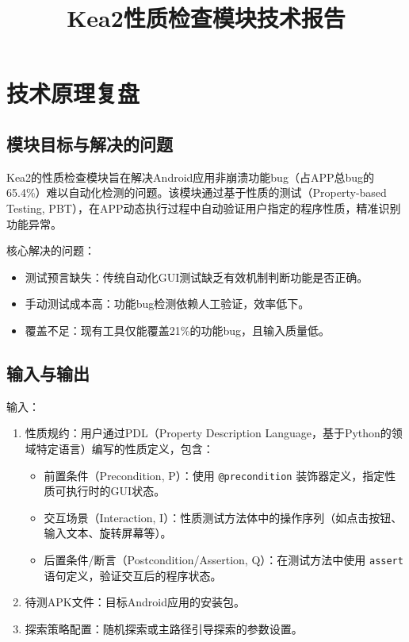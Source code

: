 \documentclass[a4paper, zihao=-4]{ctexart}
\title{\textbf{Kea2性质检查模块技术报告}}
\author{}
\date{}
\newcommand{\bff}[1]{{\heiti #1}}
\begin{document}
\maketitle

\section{技术原理复盘}

\subsection{模块目标与解决的问题}

Kea2的性质检查模块旨在解决Android应用非崩溃功能bug（占APP总bug的65.4\%）难以自动化检测的问题。该模块通过\bff{基于性质的测试（Property-based Testing, PBT）}，在APP动态执行过程中自动验证用户指定的程序性质，精准识别功能异常。

\bff{核心解决的问题}：
\begin{itemize}
    \item \bff{测试预言缺失}：传统自动化GUI测试缺乏有效机制判断功能是否正确。
    \item \bff{手动测试成本高}：功能bug检测依赖人工验证，效率低下。
    \item \bff{覆盖不足}：现有工具仅能覆盖21\%的功能bug，且输入质量低。
\end{itemize}

\subsection{输入与输出}

\bff{输入}：
\begin{enumerate}
    \item \bff{性质规约}：用户通过PDL（Property Description Language，基于Python的领域特定语言）编写的性质定义，包含：
    \begin{itemize}
        \item \bff{前置条件（Precondition, P）}：使用 \texttt{@precondition} 装饰器定义，指定性质可执行时的GUI状态。
        \item \bff{交互场景（Interaction, I）}：性质测试方法体中的操作序列（如点击按钮、输入文本、旋转屏幕等）。
        \item \bff{后置条件/断言（Postcondition/Assertion, Q）}：在测试方法中使用 \texttt{assert} 语句定义，验证交互后的程序状态。
    \end{itemize}
    \item \bff{待测APK文件}：目标Android应用的安装包。
    \item \bff{探索策略配置}：随机探索或主路径引导探索的参数设置。
\end{enumerate}
\end{document}
